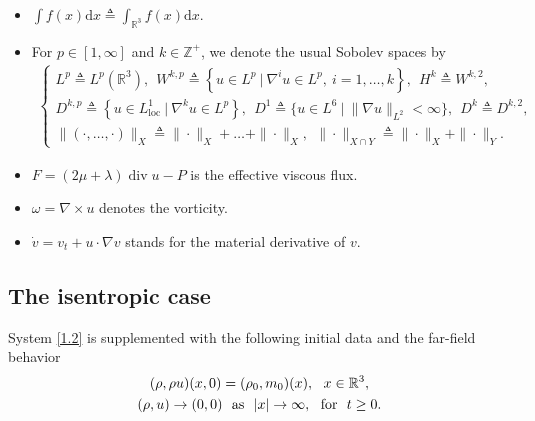 \documentclass[11pt]{article}
\DeclareMathOperator{\loc}{loc}
\DeclareMathOperator{\divv}{div}
\begin{document}
\begin{itemize}
\item [\quad(i)] $\int f(x) \mathrm{d} x\triangleq \int_{\mathbb{R}^3} f(x) \mathrm{d} x$.
\item [\quad(ii)] For $p \in [1,\infty ]$ and $k \in \mathbb{Z}^+$, we denote the usual Sobolev spaces by
\begin{align*}
\begin{cases}
L^p\triangleq L^p(\mathbb{R}^3), \ \ W^{k,p}\triangleq\left\{u\in L^p ~|~ \nabla^iu\in L^p,\ i=1,\ldots,k\right\},\ \  H^k \triangleq W^{k,2},\\
D^{k,p}\triangleq\left\{u\in L^1_{\loc} ~|~ \nabla^k u\in L^p\right\},\ \
D^1\triangleq \{u \in L^6~|~\|\nabla u\|_{L^2} < \infty \}, \ \ D^k \triangleq D^{k,2}, \\
\|(\cdot, \ldots,\cdot)\|_{X} \triangleq \|\cdot\|_{X} + \ldots + \|\cdot \|_{X},\ \ \|\cdot\|_{X \cap Y} \triangleq \|\cdot\|_{X} + \|\cdot\|_{Y}.
\end{cases}
\end{align*}
\item [\quad(iii)] $F=(2\mu+\lambda)\divv u-P$ is the effective viscous flux.
\item [\quad(iv)]  $\omega=\nabla\times u$ denotes the vorticity.
\item [\quad(v)]  $\dot v=v_t+u\cdot\nabla v$ stands for the material derivative of $v$.
\end{itemize}

\subsection{The isentropic case}

System \eqref{1.2} is supplemented with the following initial data and the far-field behavior
\begin{gather}\label{2.1}
(\rho,\rho u)(x,0)=(\rho_0,m_0)(x), \ \  x\in \mathbb{R}^3,
\\ \label{2.2}
(\rho,u)\to(0,0) \ \ {\rm as} \ \  |x|\to\infty,  \ \  {\rm for}\ \ t\geq 0.
\end{gather}
\end{document}
